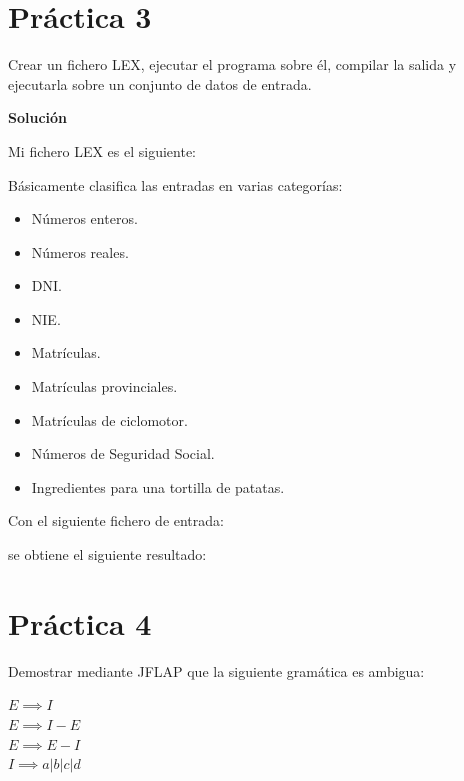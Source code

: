 \documentclass[12pt,spanish]{article}
\newenvironment{solution}{
	\par
	\textbf{Solución}
	\par

}
{
}
\begin{document}
\newpage
\section{Práctica 3}
Crear un fichero LEX, ejecutar el programa sobre él, compilar la salida y ejecutarla sobre un conjunto de datos de entrada.

\begin{solution}
	Mi fichero LEX es el siguiente:
	
	Básicamente clasifica las entradas en varias categorías:
	\begin{itemize}
		\item Números enteros.
		\item Números reales.
		\item DNI.
		\item NIE.
		\item Matrículas.
		\item Matrículas provinciales.
		\item Matrículas de ciclomotor.
		\item Números de Seguridad Social.
		\item Ingredientes para una tortilla de patatas.
	\end{itemize}
	Con el siguiente fichero de entrada:
	
	se obtiene el siguiente resultado:
	
\end{solution}
\newpage
\section{Práctica 4}
Demostrar mediante JFLAP que la siguiente gramática es ambigua:
\begin{center}
	$E \implies I$\\
	$E \implies I-E$\\
	$E \implies E-I$\\
	$I \implies a|b|c|d$
\end{center}
\end{document}
